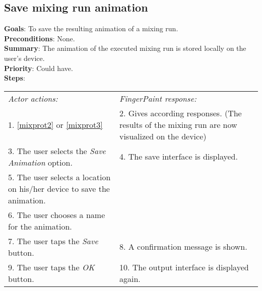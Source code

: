 \begin{appendices}
  \section{Save mixing run animation}
   \label{savemixanim}
  \textbf{Goals}: To save the resulting animation of a mixing run.\\
  \textbf{Preconditions}: None.\\
  \textbf{Summary}: The animation of the executed mixing run is stored locally on the user's device.\\
  \textbf{Priority}: Could have.\\
  \textbf{Steps}: \\
  \begin{tabular}{ p{} p{} }
  	\emph{Actor actions:} & \emph{FingerPaint response:} \\
	  1. \ref{mixprot2} or \ref{mixprot3} & 2. Gives according responses. (The results of the mixing run are now visualized  on the device) \\
	 3. The user selects the \emph{Save Animation} option. & 4. The save interface is displayed.\\
	 5. The user selects a location on his/her device to save the animation. & \\
	 6. The user chooses a name for the animation. & \\
	 7. The user taps the \emph{Save} button. & 8. A confirmation message is shown. \\
	 9. The user taps the \emph{OK} button. & 10. The output interface is displayed again. \\
  \end{tabular}


\end{appendices}
